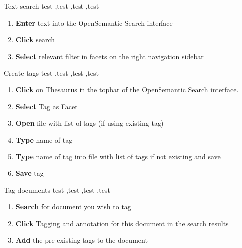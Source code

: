 \documentclass[10pt,a4paper]{article}
\begin{document}
\begin{textbox}{Text search}
test  \sep test \sep test \sep test

\bigskip

\begin{enumerate}
\item \textbf{Enter} text into the OpenSemantic Search interface 
\item \textbf{Click} search
\item \textbf{Select} relevant filter in facets on the right navigation sidebar 
\end{enumerate}

\end{textbox}


\begin{textbox}{Create tags}
test  \sep test \sep test \sep test

\bigskip

\begin{enumerate}
\item \textbf{Click} on Thesaurus in the topbar of the OpenSemantic Search interface.
\item \textbf{Select} Tag as Facet 
\item \textbf{Open} file with list of tags (if using existing tag)
\item \textbf{Type} name of tag
\item \textbf{Type} name of tag into file with list of tags if not existing and save
\item \textbf{Save} tag 
 
\end{enumerate}

\end{textbox}

\begin{textbox}{Tag documents}
test  \sep test \sep test \sep test

\bigskip

\begin{enumerate}
\item \textbf{Search} for document you wish to tag
\item \textbf{Click} Tagging and annotation for this document in the search results
\item \textbf{Add} the pre-existing tags to the document 
\end{enumerate}

\end{textbox}
\end{document}
